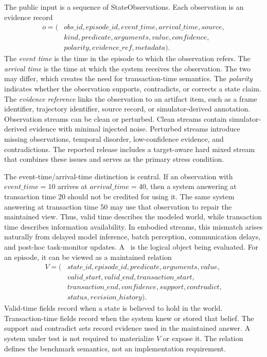 The public input is a sequence of StateObservations. Each observation is an evidence record
\begin{equation}
\begin{aligned}
o = (&obs\_id, episode\_id, event\_time, arrival\_time, source,\\
     &kind, predicate, arguments, value, confidence,\\
     &polarity, evidence\_ref, metadata).
\end{aligned}
\end{equation}
The \emph{event time} is the time in the episode to which the observation refers. The \emph{arrival time} is the time at which the system receives the observation. The two may differ, which creates the need for transaction-time semantics. The \emph{polarity} indicates whether the observation supports, contradicts, or corrects a state claim. The \emph{evidence reference} links the observation to an artifact item, such as a frame identifier, trajectory identifier, source record, or simulator-derived annotation.
Observation streams can be clean or perturbed. Clean streams contain simulator-derived evidence with minimal injected noise. Perturbed streams introduce missing observations, temporal disorder, low-confidence evidence, and contradictions. The reported release includes a target-aware hard mixed stream that combines these issues and serves as the primary stress condition.

The event-time/arrival-time distinction is central. If an observation with $event\_time=10$ arrives at $arrival\_time=40$, then a system answering at transaction time 20 should not be credited for using it. The same system answering at transaction time 50 may use that observation to repair the maintained view. Thus, valid time describes the modeled world, while transaction time describes information availability. In embodied streams, this mismatch arises naturally from delayed model inference, batch perception, communication delays, and post-hoc task-monitor updates.
A \tsv\ is the logical object being evaluated. For an episode, it can be viewed as a maintained relation
\begin{equation}
\begin{aligned}
V = (&state\_id, episode\_id, predicate, arguments, value,\\
     &valid\_start, valid\_end, transaction\_start,\\
     &transaction\_end, confidence, support, contradict,\\
     &status, revision\_history).
\end{aligned}
\end{equation}
Valid-time fields record when a state is believed to hold in the world. Transaction-time fields record when the system knew or stored that belief. The support and contradict sets record evidence used in the maintained answer. A system under test is not required to materialize $V$ or expose it. The relation defines the benchmark semantics, not an implementation requirement.

